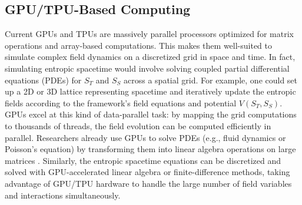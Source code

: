 \documentclass[11pt,a4paper]{article} %
\begin{document}
\subsection{GPU/TPU-Based Computing}
Current GPUs and TPUs are massively parallel processors optimized for matrix operations and array-based computations. This makes them well-suited to simulate complex field dynamics on a discretized grid in space and time. In fact, simulating entropic spacetime would involve solving coupled partial differential equations (PDEs) for \(S_T\) and \(S_S\) across a spatial grid. For example, one could set up a 2D or 3D lattice representing spacetime and iteratively update the entropic fields according to the framework's field equations and potential \(V(S_T, S_S)\). GPUs excel at this kind of data-parallel task: by mapping the grid computations to thousands of threads, the field evolution can be computed efficiently in parallel. Researchers already use GPUs to solve PDEs (e.g., fluid dynamics or Poisson’s equation) by transforming them into linear algebra operations on large matrices \cite{nvidia-gpugems}. Similarly, the entropic spacetime equations can be discretized and solved with GPU-accelerated linear algebra or finite-difference methods, taking advantage of GPU/TPU hardware to handle the large number of field variables and interactions simultaneously.
\end{document}
